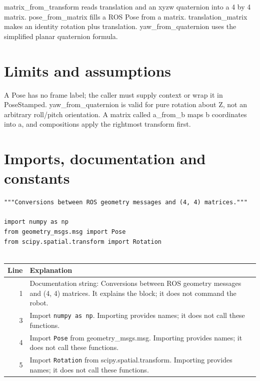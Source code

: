 \documentclass[11pt,a4paper]{book}
\begin{document}
matrix\_from\_transform reads translation and an xyzw quaternion into a 4 by 4 matrix. pose\_from\_matrix fills a ROS Pose from a matrix. translation\_matrix makes an identity rotation plus translation. yaw\_from\_quaternion uses the simplified planar quaternion formula.

\section*{Limits and assumptions}

A Pose has no frame label; the caller must supply context or wrap it in PoseStamped. yaw\_from\_quaternion is valid for pure rotation about Z, not an arbitrary roll/pitch orientation. A matrix called a\_from\_b maps b coordinates into a, and compositions apply the rightmost transform first.

\section{Imports, documentation and constants}

\begin{lstlisting}[firstnumber=1]
"""Conversions between ROS geometry messages and (4, 4) matrices."""

import numpy as np
from geometry_msgs.msg import Pose
from scipy.spatial.transform import Rotation


\end{lstlisting}

\begin{longtable}{r p{}}

\textbf{Line} & \textbf{Explanation} \\ \hline \endhead

1 & Documentation string: Conversions between ROS geometry messages and (4, 4) matrices. It explains the block; it does not command the robot. \\

3 & Import \texttt{numpy as np}. Importing provides names; it does not call these functions. \\

4 & Import \texttt{Pose} from geometry\_msgs.msg. Importing provides names; it does not call these functions. \\

5 & Import \texttt{Rotation} from scipy.spatial.transform. Importing provides names; it does not call these functions. \\

\end{longtable}
\end{document}
